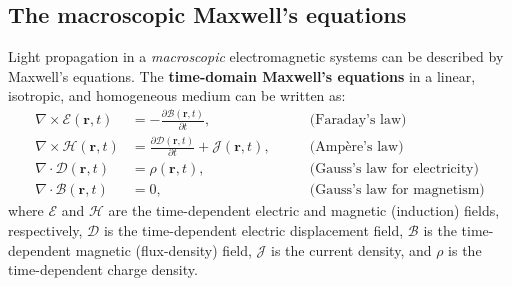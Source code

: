 \subsection*{The macroscopic Maxwell's equations}

Light propagation in a \emph{macroscopic} electromagnetic systems can be
described by Maxwell's equations. The \textbf{time-domain Maxwell's
equations} in a linear, isotropic, and homogeneous medium can be written as:
\begin{align}
    \nabla \times \bm{\mathcal{E}} (\mathbf{r},t)            & = - \frac{\partial
    \bm{\mathcal{B}}(\mathbf{r},t)}{\partial t}, \quad \quad & \text{(Faraday's
    law)} \label{eq:faraday}                                                                                         \\
    \nabla \times \bm{\mathcal{H}} (\mathbf{r},t)            & = \frac{\partial
        \bm{\mathcal{D}}(\mathbf{r},t)}{\partial t} + \bm{\mathcal{J}}(\mathbf{r},t),
    \quad \quad                                              & \text{(Ampère's law)} \label{eq:ampere}               \\
    \nabla \cdot \bm{\mathcal{D}} (\mathbf{r},t)             & =
    \mathcal{\rho}(\mathbf{r},t), \quad \quad                & \text{(Gauss's law for electricity)}
    \label{eq:gauss_E}                                                                                               \\
    \nabla \cdot \bm{\mathcal{B}} (\mathbf{r},t)             & = 0, \quad \quad
                                                             & \text{(Gauss's law for magnetism)} \label{eq:Gauss_B}
\end{align}
where $\bm{\mathcal{E}}$ and $\bm{\mathcal{H}}$ are the time-dependent electric
and magnetic (induction) fields, respectively,
$\bm{\mathcal{D}}$ is the time-dependent electric displacement field,
$\bm{\mathcal{B}}$ is the time-dependent magnetic (flux-density) field,
$\bm{\mathcal{J}}$ is the current density,
and $\mathcal{\rho}$ is the time-dependent charge density. %
